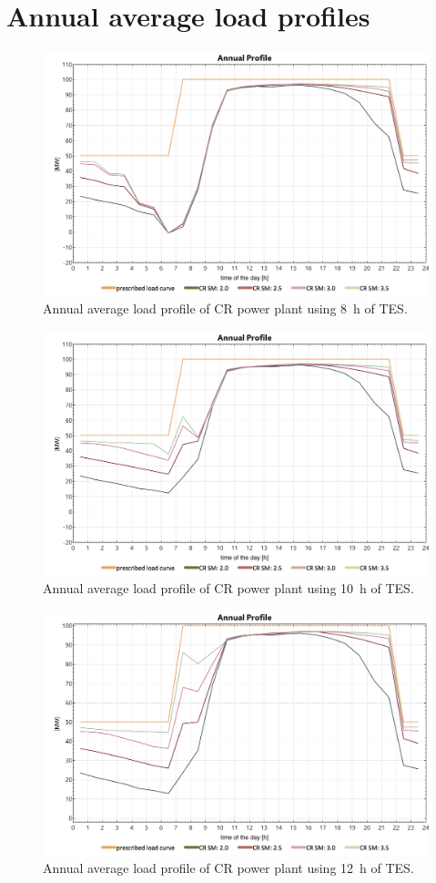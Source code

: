 \chapter{Annual average load profiles} \label{all_load_profile}
%
\begin{figure}[htbp]  
\centering
\includegraphics[width=0.8\linewidth]{FIG/Appendix_LCC/CR8h}
\caption[Annual average load profile of CR power plant using 8~h of TES.]{Annual average load profile of CR power plant using 8~h of TES.}\label{CR8h}
\end{figure}
%
\begin{figure}[htbp]  
\centering
\includegraphics[width=0.8\linewidth]{FIG/Appendix_LCC/CR10h}
\caption[Annual average load profile of CR power plant using 10~h of TES.]{Annual average load profile of CR power plant using 10~h of TES.}\label{CR10h}
\end{figure}
%
\begin{figure}[htbp]  
\centering
\includegraphics[width=0.8\linewidth]{FIG/Appendix_LCC/CR12h}
\caption[Annual average load profile of CR power plant using 12~h of TES.]{Annual average load profile of CR power plant using 12~h of TES.}\label{CR12h}
\end{figure}
